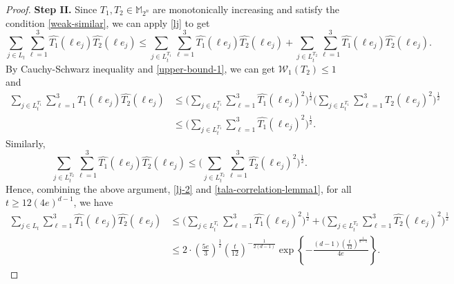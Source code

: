 \documentclass{amsbook}
\theoremstyle{definition}
\theoremstyle{remark}
\numberwithin{section}{chapter}
\numberwithin{equation}{chapter}
\newcommand{\1}{\mathbf{1}}
\begin{document}
\begin{proof}
	

	
	
	
	\textbf{Step II.} 
Since $T_1,T_2\in\mathbb{M}_{2^n}$ are  monotonically increasing and  satisfy the condition \eqref{weak-similar}, we can apply \eqref{lj} to get 
	\begin{equation}\label{lj-2}
		\sum_{j\in L_t}\sum_{\ell=1}^3\widehat{T_1}(\ell e_j)\widehat{T_2}(\ell e_j)\leq \sum_{j\in L_t^{T_1}}\sum_{\ell=1}^3\widehat{T_1}(\ell e_j)\widehat{T_2}(\ell e_j)+\sum_{j\in L_t^{T_2}}\sum_{\ell=1}^3\widehat{T_1}(\ell e_j)\widehat{T_2}(\ell e_j).
	\end{equation}
	By Cauchy-Schwarz inequality and \eqref{upper-bound-1},  we can get $\mathcal{W}_1(T_2)\leq1$ and
	\begin{align*}
		\sum_{j\in L_{t}^{T_1}}\sum_{\ell=1}^3\widehat{T_1}(\ell e_j)\widehat{T_2}(\ell e_j)&\leq\big(\sum_{j\in L_{t}^{T_1}}\sum_{\ell=1}^3\widehat{T_1}(\ell e_j)^2\big)^\frac{1}{2}\big(\sum_{j\in L_{t}^{T_1}}\sum_{\ell=1}^3\widehat{T_2}(\ell e_j)^2\big)^\frac{1}{2}\\
		&\leq \big(\sum_{j\in L_{t}^{T_1}}\sum_{\ell=1}^3\widehat{T_1}(\ell e_j)^2\big)^\frac{1}{2}.
	\end{align*}
Similarly,
	$$\sum_{j\in L_{t}^{T_2}}\sum_{\ell=1}^3\widehat{T_1}(\ell e_j)\widehat{T_2}(\ell e_j)\leq \big(\sum_{j\in L_{t}^{T_2}}\sum_{\ell=1}^3\widehat{T_2}(\ell e_j)^2\big)^\frac{1}{2}.$$
Hence, combining the above argument,   \eqref{lj-2} and \eqref{tala-correlation-lemma1}, for all $t\geq 12(4e)^{d-1}$, we have
	\begin{equation}\label{tala-correlation-lemma2}
		\begin{split}
			\sum_{j\in L_t}\sum_{\ell=1}^3\widehat{T_1}(\ell e_j)\widehat{T_2}(\ell e_j)&\leq \big(\sum_{j\in L_{t}^{T_1}}\sum_{\ell=1}^3\widehat{T_1}(\ell e_j)^2\big)^\frac{1}{2}+\big(\sum_{j\in L_{t}^{T_2}}\sum_{\ell=1}^3\widehat{T_2}(\ell e_j)^2\big)^\frac{1}{2}\\
			&\leq 2\cdot (\frac{5e}{3})^{\frac{1}{2}}(\frac{t}{12})^{-\frac{1}{2(d-1)}}\exp\left\{-\frac{(d-1)\left(\frac{t}{12}\right)^\frac{1}{d-1}}{4e}\right\}.
		\end{split}
	\end{equation}
	
	
	

\end{proof}
\end{document}
